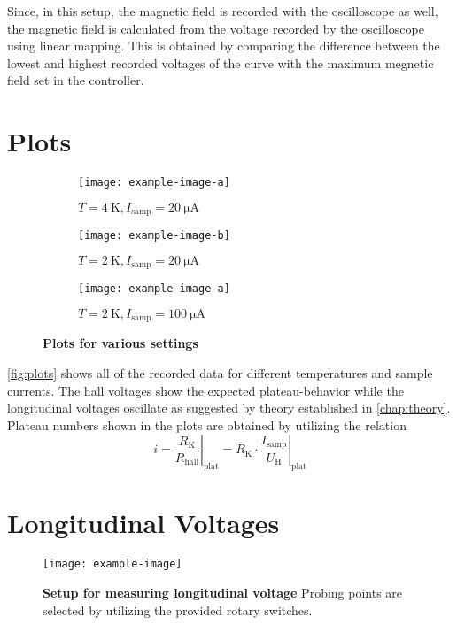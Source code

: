 Since, in this setup, the magnetic field is recorded with the oscilloscope as well, the magnetic field is calculated from the voltage recorded by the oscilloscope using linear mapping.
This is obtained by comparing the difference between the lowest and highest recorded voltages of the curve with the maximum megnetic field set in the controller.

\section{Plots}
\begin{figure}
	\centering
	\begin{subfigure}{.32\textwidth}
		\centering
		\texttt{[image: example-image-a]}
		\caption{$T=\SI{4}{\kelvin}, I_\text{samp} = \SI{20}{\micro\ampere}$}
	\end{subfigure}
	\hspace*{\fill}
	\begin{subfigure}{.32\textwidth}
		\centering
		\texttt{[image: example-image-b]}
		\caption{$T=\SI{2}{\kelvin}, I_\text{samp} = \SI{20}{\micro\ampere}$}
	\end{subfigure}
	\hspace*{\fill}
	\begin{subfigure}{.32\textwidth}
		\centering
		\texttt{[image: example-image-a]}
		\caption{$T=\SI{2}{\kelvin}, I_\text{samp} = \SI{100}{\micro\ampere}$}
	\end{subfigure}
	\caption[Plots for various settings]{\textbf{Plots for various settings}}
	\label{fig:plots}
\end{figure}
\autoref{fig:plots} shows all of the recorded data for different temperatures and sample currents.
The hall voltages show the expected plateau-behavior while the longitudinal voltages oscillate as suggested by theory established in \autoref{chap:theory}.
Plateau numbers shown in the plots are obtained by utilizing the relation
\begin{equation*}
	i = \left. \frac{R_\text{K}}{R_\text{hall}} \right\rvert_{\text{plat}} = R_\text{K}\cdot\left. \frac{I_\text{samp}}{U_\text{H}}\right\rvert_{\text{plat}}
\end{equation*}

\section{Longitudinal Voltages}
\begin{figure}
	\centering
	\texttt{[image: example-image]}
	\caption[Setup for measuring longitudinal voltage]{\textbf{Setup for measuring longitudinal voltage} Probing points are selected by utilizing the provided rotary switches.}
	\label{fig:setup_long_don_jon}
\end{figure}

